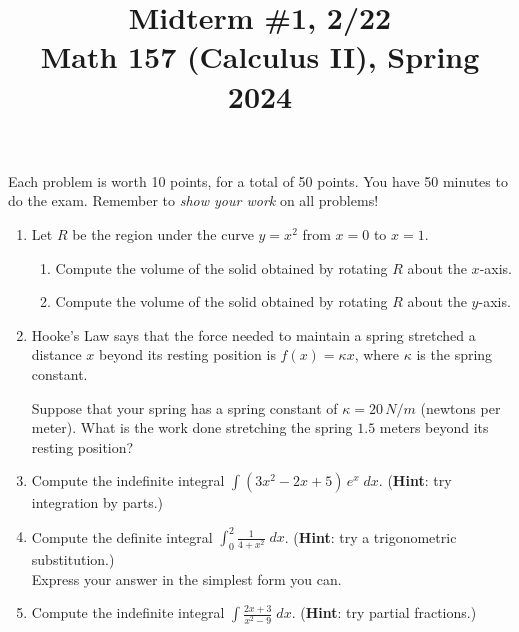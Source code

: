 \documentclass[11pt]{article}
\title{Midterm \#1, 2/22 \\ Math 157 (Calculus II), Spring 2024}
\date{}
\begin{document}
\maketitle

\thispagestyle{empty}

\vspace{-1cm}

Each problem is worth 10 points, for a total of 50 points. You have 50 minutes to do the exam. Remember to \emph{show your work} on all problems!

\begin{enumerate}
\item Let $R$ be the region under the curve $y=x^2$ from $x=0$ to $x=1$. \begin{enumerate}
\item Compute the volume of the solid obtained by rotating $R$ about the $x$-axis.
\item Compute the volume of the solid obtained by rotating $R$ about the $y$-axis.
\end{enumerate}
\item Hooke's Law says that the force needed to maintain a spring stretched a distance $x$ beyond its resting position is $f(x) = \kappa x$, where $\kappa$ is the spring constant. 

Suppose that your spring has a spring constant of $\kappa = 20 \, N/m$ (newtons per meter). What is the work done stretching the spring $1.5$ meters beyond its resting position?
\item Compute the indefinite integral $\displaystyle \int (3x^2-2x+5) \, e^{x} \; dx$. ({\bf Hint}: try integration by parts.)
\item Compute the definite integral $\displaystyle \int_{0}^{2} \frac{1}{4+x^2} \; dx$. ({\bf Hint}: try a trigonometric substitution.) \\ Express your answer in the simplest form you can.
\item Compute the indefinite integral $\displaystyle \int \frac{2x+3}{x^2-9} \; dx$. ({\bf Hint}: try partial fractions.)
\end{enumerate}
\end{document}
